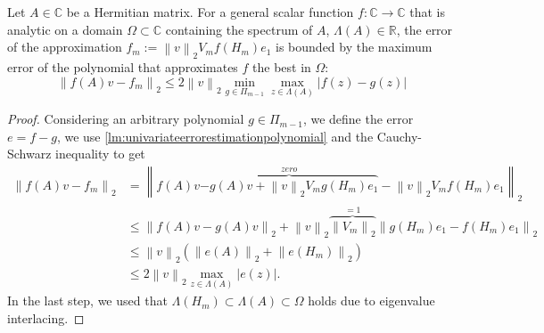 \begin{theorem}
    \label{th:univariateerrorestimationgeneral}
    Let $A \in \mathbb{C}$ be a Hermitian matrix. For a general scalar function $f: \mathbb{C} \to \mathbb{C}$ that is
    analytic on a domain $\Omega \subset \mathbb{C}$ containing the spectrum of $A$, $\Lambda(A) \in \mathbb{R}$, the
    error of the approximation $f_m := \left\| v \right\|_{2} V_m f(H_m) e_1$ is bounded by the maximum error of the
    polynomial that approximates $f$ the best in $\Omega$:
    \begin{equation}
        \label{eq:univariateerrorestimationgeneral}
        \left\| f(A)v - f_m \right\|_2 \le 2 \left\| v \right\|_2 \min_{g \in \Pi_{m-1}} \max_{z \in \Lambda(A)} \left|f(z) - g(z) \right|
    \end{equation}
\end{theorem}
\begin{proof}
    Considering an arbitrary polynomial $g \in \Pi_{m-1}$, we define the error $e = f - g$, we use
    \autoref{lm:univariateerrorestimationpolynomial} and the Cauchy-Schwarz inequality to get
    \begin{equation*}
        \begin{aligned}
            \left\| f(A)v - f_m \right\|_2
                & = \left\| f(A)v \overset{zero}{\overbrace{- g(A)v + \left\| v \right\|_{2} V_m g(H_m) e_1}}
                - \left\| v \right\|_{2} V_m f(H_m) e_1 \right\|_2 \\
            & \le \left\| f(A)v - g(A)v \right\|_{2}
                + \left\| v \right\|_{2} \overset{=1}{\overbrace{\left\| V_m \right\|_2}}
                \left\| g(H_m) e_1 - f(H_m) e_1 \right\|_2\\
            & \le \left\| v \right\|_2 \left( \left\| e(A) \right\|_2 + \left\| e(H_m) \right\|_2 \right)\\
            & \le 2 \left\| v \right\|_2 \max_{z \in \Lambda(A)} \left| e(z) \right|.
            \end{aligned}
    \end{equation*}
    In the last step, we used that $\Lambda(H_m) \subset \Lambda(A) \subset \Omega$ holds due to eigenvalue interlacing.
\end{proof}


